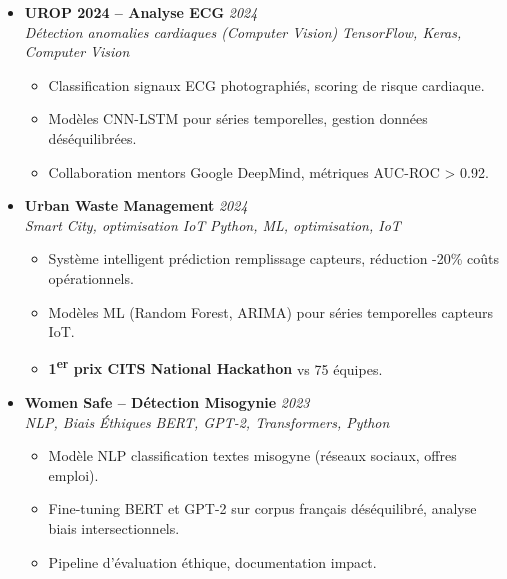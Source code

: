 \documentclass[a4paper,11pt]{article}
\begin{document}
\begin{itemize}[leftmargin=*, label={-}]
    \item \textbf{UROP 2024 -- Analyse ECG} \hfill \textit{2024} \\
    \textit{D\'etection anomalies cardiaques (Computer Vision)} \hfill \textit{TensorFlow, Keras, Computer Vision}
    \vspace{-2pt}
    \begin{itemize}[leftmargin=0.4cm, nosep, label=\tiny$\bullet$]
        \item \small{Classification signaux ECG photographi\'es, scoring de risque cardiaque.}
        \item \small{Mod\`eles CNN-LSTM pour s\'eries temporelles, gestion donn\'ees d\'es\'equilibr\'ees.}
        \item \small{Collaboration mentors Google DeepMind, m\'etriques AUC-ROC > 0.92.}
    \end{itemize}
    \vspace{3pt}

    \item \textbf{Urban Waste Management} \hfill \textit{2024} \\
    \textit{Smart City, optimisation IoT} \hfill \textit{Python, ML, optimisation, IoT}
    \vspace{-2pt}
    \begin{itemize}[leftmargin=0.4cm, nosep, label=\tiny$\bullet$]
        \item \small{Syst\`eme intelligent prédiction remplissage capteurs, r\'eduction -20\% co\^uts op\'erationnels.}
        \item \small{Mod\`eles ML (Random Forest, ARIMA) pour s\'eries temporelles capteurs IoT.}
        \item \small{\textbf{1\textsuperscript{er} prix CITS National Hackathon} vs 75 \'equipes.}
    \end{itemize}
    \vspace{3pt}

    \item \textbf{Women Safe -- D\'etection Misogynie} \hfill \textit{2023} \\
    \textit{NLP, Biais \'Ethiques} \hfill \textit{BERT, GPT-2, Transformers, Python}
    \vspace{-2pt}
    \begin{itemize}[leftmargin=0.4cm, nosep, label=\tiny$\bullet$]
        \item \small{Mod\`ele NLP classification textes misogyne (r\'eseaux sociaux, offres emploi).}
        \item \small{Fine-tuning BERT et GPT-2 sur corpus fran\c cais d\'es\'equilibr\'e, analyse biais intersectionnels.}
        \item \small{Pipeline d'\'evaluation \'ethique, documentation impact.}
    \end{itemize}
    \vspace{3pt}


\end{itemize}
\end{document}
